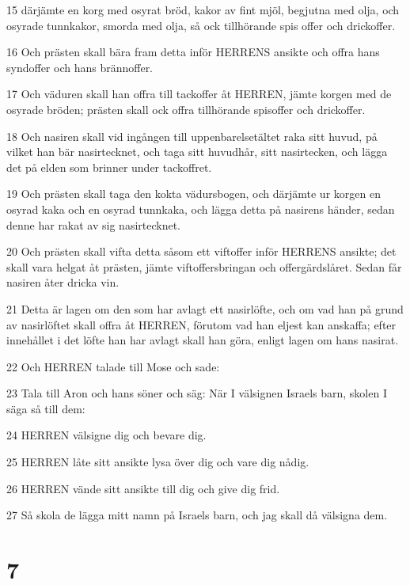 \par 15 därjämte en korg med osyrat bröd, kakor av fint mjöl, begjutna med olja, och osyrade tunnkakor, smorda med olja, så ock tillhörande spis offer och drickoffer.
\par 16 Och prästen skall bära fram detta inför HERRENS ansikte och offra hans syndoffer och hans brännoffer.
\par 17 Och väduren skall han offra till tackoffer åt HERREN, jämte korgen med de osyrade bröden; prästen skall ock offra tillhörande spisoffer och drickoffer.
\par 18 Och nasiren skall vid ingången till uppenbarelsetältet raka sitt huvud, på vilket han bär nasirtecknet, och taga sitt huvudhår, sitt nasirtecken, och lägga det på elden som brinner under tackoffret.
\par 19 Och prästen skall taga den kokta vädursbogen, och därjämte ur korgen en osyrad kaka och en osyrad tunnkaka, och lägga detta på nasirens händer, sedan denne har rakat av sig nasirtecknet.
\par 20 Och prästen skall vifta detta såsom ett viftoffer inför HERRENS ansikte; det skall vara helgat åt prästen, jämte viftoffersbringan och offergärdslåret. Sedan får nasiren åter dricka vin.
\par 21 Detta är lagen om den som har avlagt ett nasirlöfte, och om vad han på grund av nasirlöftet skall offra åt HERREN, förutom vad han eljest kan anskaffa; efter innehållet i det löfte han har avlagt skall han göra, enligt lagen om hans nasirat.
\par 22 Och HERREN talade till Mose och sade:
\par 23 Tala till Aron och hans söner och säg: När I välsignen Israels barn, skolen I säga så till dem:
\par 24 HERREN välsigne dig och bevare dig.
\par 25 HERREN låte sitt ansikte lysa över dig och vare dig nådig.
\par 26 HERREN vände sitt ansikte till dig och give dig frid.
\par 27 Så skola de lägga mitt namn på Israels barn, och jag skall då välsigna dem.

\chapter{7}

